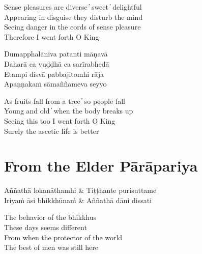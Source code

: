 \begin{english}
  Sense pleasures are diverse  ̓  sweet  ̓  delightful\\
  Appearing in disguise they disturb the mind\\
  Seeing danger in the cords of sense pleasure\\
  Therefore I went forth O King
\end{english}

\begin{twochants}
  Dumapphalānīva patanti māṇavā\\
  Daharā ca vuḍḍhā ca sarīrabhedā\\
  Etampi disvā pabbajitomhi rāja\\
  Apaṇṇakaṁ sāmaññameva seyyo
\end{twochants}

\begin{english}
  As fruits fall from a tree  ̓  so people fall\\
  Young and old  ̓  when the body breaks up\\
  Seeing this too I went forth O King\\
  Surely the ascetic life is better
\end{english}


\clearpage

\section{From the Elder Pārāpariya}

\begin{leader}
\end{leader}

\begin{twochants}
  Aññathā lokanāthamhi & Tiṭṭhante purisuttame\\
  Iriyaṁ āsi bhikkhūnaṁ & Aññathā dāni dissati\\
\end{twochants}

\begin{english}
  The behavior of the bhikkhus\\
  These days seems different\\
  From when the protector of the world\\
  The best of men was still here
\end{english}

